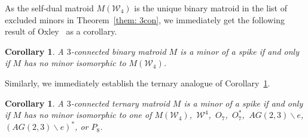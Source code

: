 \documentclass[11pt]{amsart}
\newtheorem{corollary}[theorem]{Corollary}
\numberwithin{equation}{section} %
\newcommand{\cW}{\mathcal{W}}
\begin{document}
%	
%	

As the self-dual matroid $M(\cW_4)$ is the unique binary matroid in the list of excluded minors in Theorem~\ref{them: 3con}, we immediately get the following result of Oxley~\cite{ox87} as a corollary.

\begin{corollary}
A $3$-connected binary matroid $M$ is a minor of a spike if and only if $M$ has no minor isomorphic to $M(\cW_4)$.
\label{binary}
\end{corollary}

Similarly, we immediately establish the ternary analogue of Corollary~\ref{binary}.

\begin{corollary}
A $3$-connected ternary matroid $M$ is a minor of a spike if and only if $M$ has no minor isomorphic to one of $M(\cW_4)$,\, $\cW^4$,\, $O_7$,\, $O_7^*$,\, $AG(2,3)\backslash e$,\, $(AG(2,3)\backslash e)^*$, or $P_8$.
\end{corollary}
\end{document}
